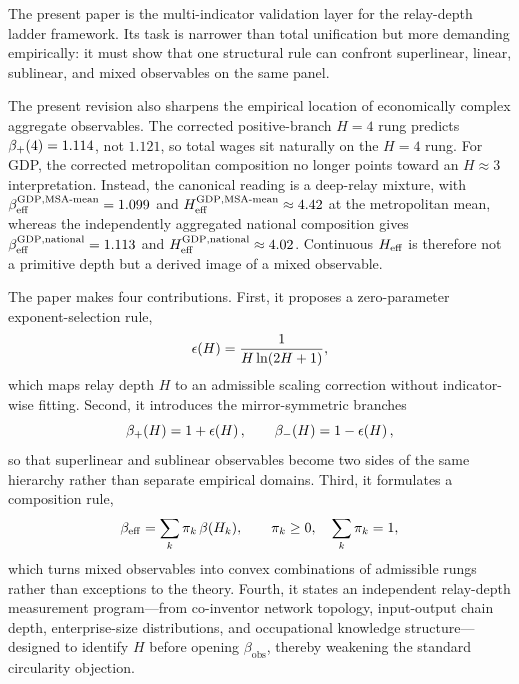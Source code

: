 The present paper is the multi-indicator validation layer for the relay-depth ladder framework.
Its task is narrower than total unification but more demanding empirically:
it must show that one structural rule can confront superlinear, linear,
sublinear, and mixed observables on the same panel.

The present revision also sharpens the empirical location of economically
complex aggregate observables.
The corrected positive-branch \(H=4\) rung predicts
\(\beta_+\!\left(4\right)=1.114\), not \(1.121\), so total wages sit naturally on the
\(H=4\) rung.
For GDP, the corrected metropolitan composition no longer points toward an
\(H\approx 3\) interpretation.
Instead, the canonical reading is a deep-relay mixture, with
\(\beta_{\mathrm{eff}}^{\mathrm{GDP,MSA\text{-}mean}}=1.099\) and
\(H_{\mathrm{eff}}^{\mathrm{GDP,MSA\text{-}mean}}\approx 4.42\) at the metropolitan mean,
whereas the independently aggregated national composition gives
\(\beta_{\mathrm{eff}}^{\mathrm{GDP,national}}=1.113\) and
\(H_{\mathrm{eff}}^{\mathrm{GDP,national}}\approx 4.02\).
Continuous \(H_{\mathrm{eff}}\) is therefore not a primitive depth but a derived image
of a mixed observable.

The paper makes four contributions.
First, it proposes a zero-parameter exponent-selection rule,
\begin{equation}
\epsilon\!\left(H\right)=\frac{1}{H\ln(2H+1)},
\label{eq:epsilon}
\end{equation}
which maps relay depth \(H\) to an admissible scaling correction without
indicator-wise fitting.
Second, it introduces the mirror-symmetric branches
\begin{equation}
\beta_+\!\left(H\right)=1+\epsilon\!\left(H\right), \qquad \beta_-\!\left(H\right)=1-\epsilon\!\left(H\right),
\label{eq:branches}
\end{equation}
so that superlinear and sublinear observables become two sides of the same
hierarchy rather than separate empirical domains.
Third, it formulates a composition rule,
\begin{equation}
\beta_{\mathrm{eff}}=\sum_k \pi_k\,\beta(H_k), \qquad \pi_k\ge 0,\quad \sum_k \pi_k=1,
\label{eq:mixture}
\end{equation}
which turns mixed observables into convex combinations of admissible rungs
rather than exceptions to the theory.
Fourth, it states an independent relay-depth measurement program---from
co-inventor network topology, input-output chain depth, enterprise-size
distributions, and occupational knowledge structure---designed to identify
\(H\) before opening \(\beta_{\mathrm{obs}}\), thereby weakening the standard
circularity objection.

